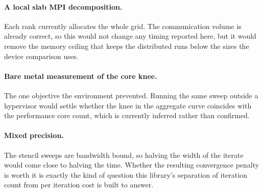 \paragraph{A local slab MPI decomposition.} Each rank currently allocates the
whole grid. The communication volume is already correct, so this would not change
any timing reported here, but it would remove the memory ceiling that keeps the
distributed runs below the sizes the device comparison uses.

\paragraph{Bare metal measurement of the core knee.} The one objective the
environment prevented. Running the same sweep outside a hypervisor would settle
whether the knee in the aggregate curve coincides with the performance core
count, which is currently inferred rather than confirmed.

\paragraph{Mixed precision.} The stencil sweeps are bandwidth bound, so halving
the width of the iterate would come close to halving the time. Whether the
resulting convergence penalty is worth it is exactly the kind of question this
library's separation of iteration count from per iteration cost is built to
answer.
